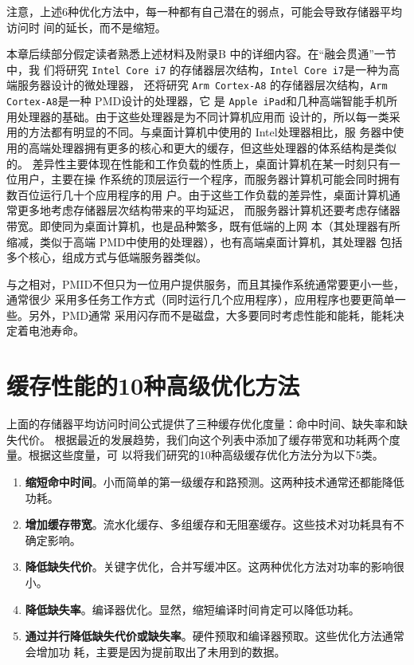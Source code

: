 注意，上述6种优化方法中，每一种都有自己潜在的弱点，可能会导致存储器平均访问时
间的延长，而不是缩短。

本章后续部分假定读者熟悉上述材料及附录B 中的详细内容。在“融会贯通”一节中，我
们将研究 \verb|Intel Core i7| 的存储器层次结构，\verb|Intel Core i7|是一种为高端服务器设计的微处理器，
还将研究 \verb|Arm Cortex-A8| 的存储器层次结构，\verb|Arm Cortex-A8|是一种 PMD设计的处理器，它
是 \verb|Apple iPad|和几种高端智能手机所用处理器的基础。由于这些处理器是为不同计算机应用而
设计的，所以每一类采用的方法都有明显的不同。与桌面计算机中使用的 Intel处理器相比，服
务器中使用的高端处理器拥有更多的核心和更大的缓存，但这些处理器的体系结构是类似的。
差异性主要体现在性能和工作负载的性质上，桌面计算机在某一时刻只有一位用户，主要在操
作系统的顶层运行一个程序，而服务器计算机可能会同时拥有数百位运行几十个应用程序的用
户。由于这些工作负载的差异性，桌面计算机通常更多地考虑存储器层次结构带来的平均延迟，
而服务器计算机还要考虑存储器带宽。即使同为桌面计算机，也是品种繁多，既有低端的上网
本（其处理器有所缩减，类似于高端 PMD中使用的处理器），也有高端桌面计算机，其处理器
包括多个核心，组成方式与低端服务器类似。

与之相对，PMID不但只为一位用户提供服务，而且其操作系统通常要更小一些，通常很少
采用多任务工作方式（同时运行几个应用程序），应用程序也要更简单一些。另外，PMD通常
采用闪存而不是磁盘，大多要同时考虑性能和能耗，能耗决定着电池寿命。

\section{缓存性能的10种高级优化方法}
上面的存储器平均访问时间公式提供了三种缓存优化度量：命中时间、缺失率和缺失代价。
根据最近的发展趋势，我们向这个列表中添加了缓存带宽和功耗两个度量。根据这些度量，可
以将我们研究的10种高级缓存优化方法分为以下5类。

\begin{enumerate}
    \item \textbf{缩短命中时间}。小而简单的第一级缓存和路预测。这两种技术通常还都能降低功耗。
    \item \textbf{增加缓存带宽}。流水化缓存、多组缓存和无阻塞缓存。这些技术对功耗具有不确定影响。
    \item \textbf{降低缺失代价}。关键字优化，合并写缓冲区。这两种优化方法对功率的影响很小。
    \item \textbf{降低缺失率}。编译器优化。显然，缩短编译时间肯定可以降低功耗。
    \item \textbf{通过并行降低缺失代价或缺失率}。硬件预取和编译器预取。这些优化方法通常会增加功
    耗，主要是因为提前取出了未用到的数据。
\end{enumerate}

